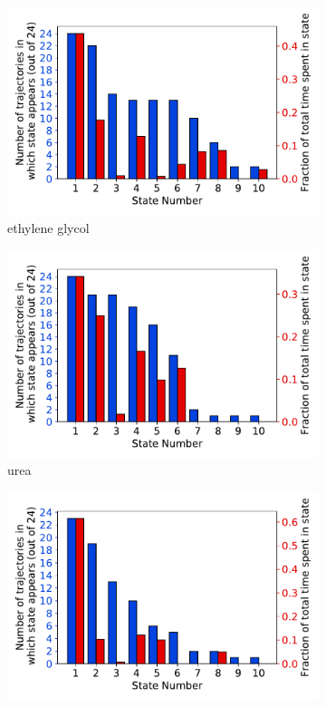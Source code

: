 \documentclass{article}
\begin{document}
  \begin{figure}[h]
  \centering
  \begin{subfigure}{0.325\textwidth}
  \includegraphics[width=\textwidth]{prevalence_GCL.pdf}
  \caption{ethylene glycol}\label{fig:prevalence_GCL}
  \end{subfigure}
  \begin{subfigure}{0.325\textwidth}
  \includegraphics[width=\textwidth]{prevalence_URE.pdf}
  \caption{urea}\label{fig:prevalence_URE}
  \end{subfigure}
  \begin{subfigure}{0.325\textwidth}
  \includegraphics[width=\textwidth]{prevalence_ACH.pdf}

\end{subfigure}
\end{figure}
\end{document}
